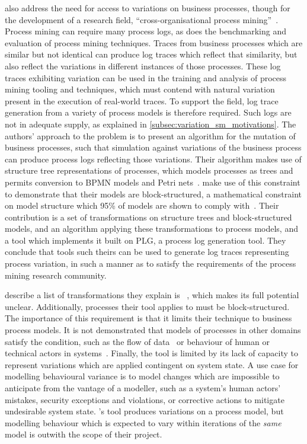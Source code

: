\citeauthor{pourmasoumi2015business} also address the need for access to
variations on business processes, though for the development of a research
field, ``cross-organisational process mining''~\cite{pourmasoumi2015business}.
Process mining can require many process logs, as does the benchmarking and
evaluation of process mining techniques. Traces from business processes which
are similar but not identical can produce log traces which reflect that
similarity, but also reflect the variations in different instances of those
processes. These log traces exhibiting variation can be used in the training and
analysis of process mining tooling and techniques, which must contend with
natural variation present in the execution of real-world traces. To support the
field, log trace generation from a variety of process models is therefore
required. Such logs are not in adequate supply, as explained in
\cref{subsec:variation_sm_motivations}. The authors' approach to the problem is
to present an algorithm for the mutation of business processes, such that
simulation against variations of the business process can produce process logs
reflecting those variations. Their algorithm makes use of structure tree
representations of processes, which models processes as trees and permits
conversion to BPMN models and Petri nets~\cite{buijs2014flexible}.
\citeauthor{pourmasoumi2015business} make use of this constraint to demonstrate
that their models are block-structured, a mathematical constraint on model
structure which 95\% of models are shown to comply with~\cite{chenthesis}. Their
contribution is a set of transformations on structure trees and block-structured
models, and an algorithm applying these transformations to process models, and a
tool which implements it built on PLG, a process log generation tool. They
conclude that tools such theirs can be used to generate log traces representing
process variation, in such a manner as to satisfy the requirements of the
process mining research community.

\citeauthor{pourmasoumi2015business} describe a list of transformations they
explain is ~\cite{pourmasoumi2015business}, which makes its full potential
unclear. Additionally, processes their tool applies to must be block-structured.
The importance of this requirement is that it limits their technique to business
process models. It is not demonstrated that models of processes in other domains
satisfy the condition, such as the flow of data~\cite{obashimethodology} or
behaviour of human or technical actors in \sociotechnical
systems~\cite{wallis2018caise}. Finally, the tool is limited by its lack of
capacity to represent variations which are applied contingent on system state. A
use case for modelling behavioural variance is to model changes which are
impossible to anticipate from the vantage of a modeller, such as a
\sociotechnical system's human actors' mistakes, security exceptions and
violations, or corrective actions to mitigate undesirable system state.
\citeauthor{pourmasoumi2015business}'s tool produces variations on a process
model, but modelling behaviour which is expected to vary within iterations of
the \emph{same} model is outwith the scope of their project.


